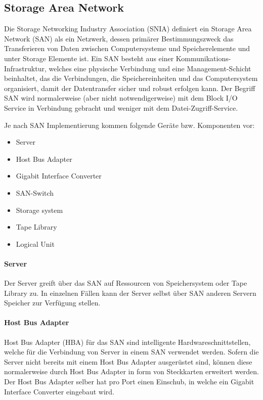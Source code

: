 \subsection{Storage Area Network}
Die Storage Networking Industry Association (\gls{SNIA}) definiert ein Storage Area Network (SAN) als ein Netzwerk, dessen primärer Bestimmungszweck das Transferieren von Daten zwischen Computersysteme und Speicherelemente und unter Storage Elemente ist. Ein SAN besteht aus einer Kommunikations-Infrastruktur, welches eine physische Verbindung und eine Management-Schicht beinhaltet, das die Verbindungen, die Speichereinheiten und das Computersystem organisiert, damit der Datentransfer sicher und robust erfolgen kann. Der Begriff SAN wird normalerweise (aber nicht notwendigerweise) mit dem Block I/O Service in Verbindung gebracht und weniger mit dem Datei-Zugriff-Service.\cite{SNIA2011}

Je nach SAN Implementierung kommen folgende Geräte bzw. Komponenten vor:
\begin{itemize}
\item Server
\item Host Bus Adapter
\item Gigabit Interface Converter
\item SAN-Switch
\item Storage system
\item Tape Library
\item Logical Unit
\end{itemize}

\paragraph*{Server} 
Der Server greift über das SAN auf Ressourcen von Speichersystem oder Tape Library zu. In einzelnen Fällen kann der Server selbst über SAN anderen Servern Speicher zur Verfügung stellen.

\paragraph*{Host Bus Adapter}
Host Bus Adapter (HBA) für das SAN sind intelligente Hardwareschnittstellen, welche für die Verbindung von Server in einem SAN verwendet werden. Sofern die Server nicht bereits mit einem Host Bus Adapter ausgerüstet sind, können diese normalerweise durch Host Bus Adapter in form von Steckkarten erweitert werden. Der Host Bus Adapter selber hat pro Port einen Einschub, in welche ein Gigabit Interface Converter eingebaut wird. \cite{Christopher2009}

